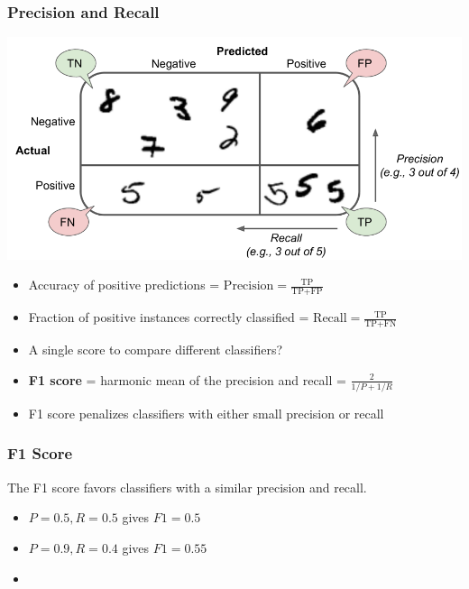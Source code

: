 \documentclass[xcolor=table]{beamer}
\newcommand{\TP}{\ensuremath{\text{TP}}}
\newcommand{\FP}{\ensuremath{\text{FP}}}
\newcommand{\FN}{\ensuremath{\text{FN}}}
\begin{document}
\begin{frame}[t]
\frametitle{Precision and Recall}
\begin{center}
	\includegraphics[scale=0.2]{precision_recall.png}
\end{center}
\begin{itemize}
	\item Accuracy of positive predictions = $\text{Precision} = \frac{\TP}{\TP + \FP}$
	
	\item Fraction of positive instances correctly classified = $\text{Recall} = \frac{\TP}{\TP + \FN}$  
	
	\pause
	
	\item A single score to compare different classifiers?
	
	\pause
	
	\item \textbf{F1 score} = harmonic mean of the precision and recall = $\frac{2}{1/P + 1/R}$
	
	\item F1 score penalizes classifiers with either small precision or recall
\end{itemize}
\end{frame}

\begin{frame}[t]
\frametitle{F1 Score}
The F1 score favors classifiers with a similar precision and recall.

\begin{itemize}
	\item $P = 0.5, R = 0.5$ gives $F1 = 0.5$
	\item $P = 0.9, R = 0.4$ gives $F1 = 0.55$
	\item 
\end{itemize}
\end{frame}
\end{document}
